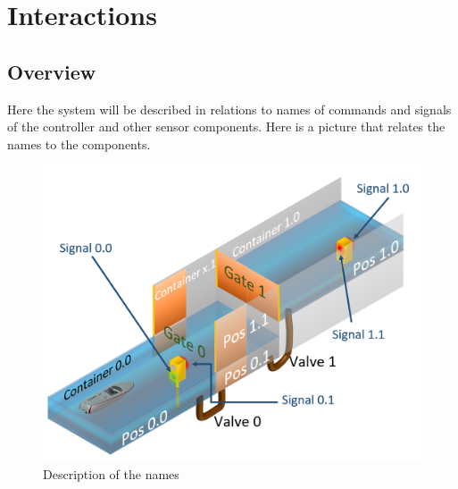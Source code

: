 \section{Interactions}

\subsection{Overview}

Here the system will be described in relations to names of commands and signals of the controller and other sensor components. Here is a picture that relates the names to the components.

\begin{figure}[!h]
	\includegraphics[width=\linewidth]{PictureName10}
	\caption{Description of the names}
	\label{fig:boat1}
\end{figure}
\pagebreak


